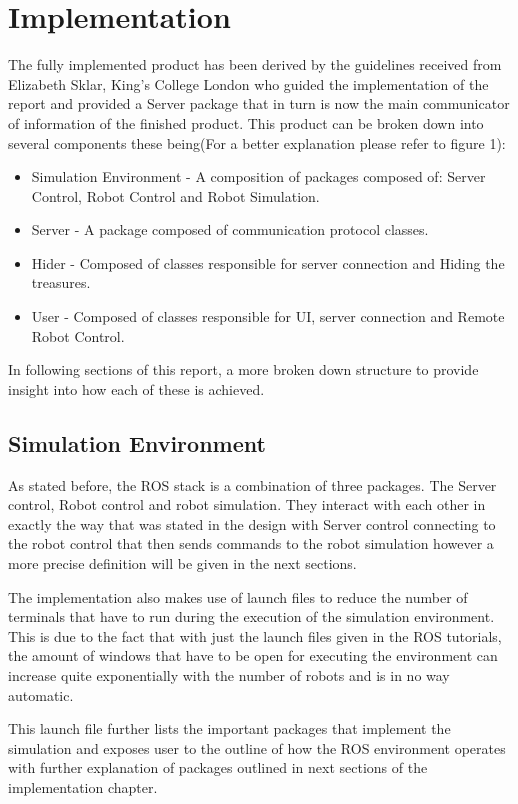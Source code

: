 \chapter{Implementation}
  The fully implemented product has been derived by the guidelines received from Elizabeth Sklar, King's College London who guided the implementation of the report and provided a Server package that in turn is now the main communicator of information of the finished product. This product can be broken down into several components these being(For a better explanation please refer to figure 1):
  \begin{itemize}
    \item Simulation Environment - A composition of packages composed of: Server Control, Robot Control and Robot Simulation.
    \item Server - A package composed of communication protocol classes.
    \item Hider - Composed of classes responsible for server connection and Hiding the treasures.
    \item User - Composed of classes responsible for UI, server connection and Remote Robot Control.
  \end{itemize}

  In following sections of this report, a more broken down structure to provide insight into how each of these is achieved.

  \section{Simulation Environment}
    As stated before, the ROS stack is a combination of three packages. The Server control, Robot control and robot simulation. They interact with each other in exactly the way that was stated in the design with Server control connecting to the robot control that then sends commands to the robot simulation however a more precise definition will be given in the next sections.

    The implementation also makes use of launch files to reduce the number of terminals that have to run during the execution of the simulation environment. This is due to the fact that with just the launch files given in the ROS tutorials, the amount of windows that have to be open for executing the environment can increase quite exponentially with the number of robots and is in no way automatic.

    This launch file further lists the important packages that implement the simulation and exposes user to the outline of how the ROS environment operates with further explanation of packages outlined in next sections of the implementation chapter.

